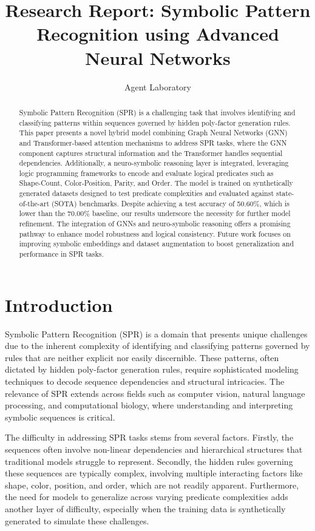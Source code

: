 \documentclass{article}
\title{Research Report: Symbolic Pattern Recognition using Advanced Neural Networks}
\author{Agent Laboratory}
\date{}
\begin{document}
\maketitle

\begin{abstract}
Symbolic Pattern Recognition (SPR) is a challenging task that involves identifying and classifying patterns within sequences governed by hidden poly-factor generation rules. This paper presents a novel hybrid model combining Graph Neural Networks (GNN) and Transformer-based attention mechanisms to address SPR tasks, where the GNN component captures structural information and the Transformer handles sequential dependencies. Additionally, a neuro-symbolic reasoning layer is integrated, leveraging logic programming frameworks to encode and evaluate logical predicates such as Shape-Count, Color-Position, Parity, and Order. The model is trained on synthetically generated datasets designed to test predicate complexities and evaluated against state-of-the-art (SOTA) benchmarks. Despite achieving a test accuracy of 50.60\%, which is lower than the 70.00\% baseline, our results underscore the necessity for further model refinement. The integration of GNNs and neuro-symbolic reasoning offers a promising pathway to enhance model robustness and logical consistency. Future work focuses on improving symbolic embeddings and dataset augmentation to boost generalization and performance in SPR tasks.
\end{abstract}

\section{Introduction}
Symbolic Pattern Recognition (SPR) is a domain that presents unique challenges due to the inherent complexity of identifying and classifying patterns governed by rules that are neither explicit nor easily discernible. These patterns, often dictated by hidden poly-factor generation rules, require sophisticated modeling techniques to decode sequence dependencies and structural intricacies. The relevance of SPR extends across fields such as computer vision, natural language processing, and computational biology, where understanding and interpreting symbolic sequences is critical.

The difficulty in addressing SPR tasks stems from several factors. Firstly, the sequences often involve non-linear dependencies and hierarchical structures that traditional models struggle to represent. Secondly, the hidden rules governing these sequences are typically complex, involving multiple interacting factors like shape, color, position, and order, which are not readily apparent. Furthermore, the need for models to generalize across varying predicate complexities adds another layer of difficulty, especially when the training data is synthetically generated to simulate these challenges.
\end{document}
